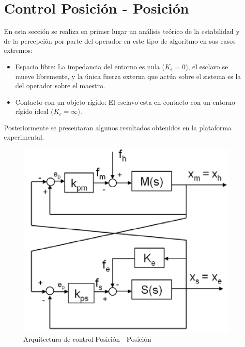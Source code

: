 \section{Control Posición - Posición}
\label{sec:pos-pos}
En esta sección se realiza en primer lugar un análisis teórico de la estabilidad y de la percepción por parte del operador en este tipo de algoritmo en sus casos extremos:
\begin{itemize}
\item Espacio libre: La impedancia del entorno es nula ($K_e = 0$), el esclavo se mueve libremente, y la única fuerza externa que actúa sobre el sistema es la del operador sobre el maestro.
\item Contacto con un objeto rígido: El esclavo esta en contacto con un entorno rígido ideal ($K_e = \infty$).
\end{itemize}
Posteriormente se presentaran algunos resultados obtenidos en la plataforma experimental.
\begin{figure}[htbp]
\centering
	\includegraphics[scale=0.5]{pos-pos}
	\caption{Arquitectura de control Posición - Posición} %
  	\label{fig:pos-pos} %
\end{figure}

